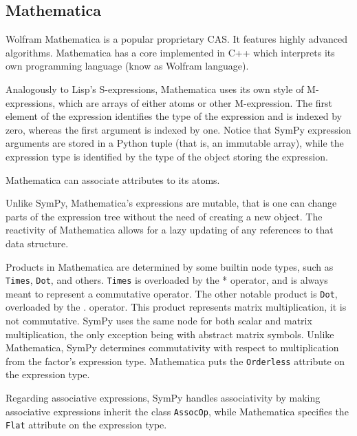 
\subsection{Mathematica}

Wolfram Mathematica is a popular proprietary CAS.
It features highly advanced algorithms.
Mathematica has a core implemented in C++
which interprets its own programming language (know as Wolfram language).


Analogously to Lisp's S-expressions,
Mathematica uses its own style of M-expressions,
which are arrays of either atoms or other M-expression.
The first element of the expression identifies the type of the expression
and is indexed by zero, whereas the first argument is indexed by one.
Notice that SymPy expression arguments are stored in a Python tuple
(that is, an immutable array),
while the expression type is identified by the type of the object storing the
expression.


Mathematica can associate attributes to its atoms.


Unlike SymPy, Mathematica's expressions are mutable,
that is one can change parts of the expression tree without the need of
creating a new object.
The reactivity of Mathematica allows for a lazy updating of any references
to that data structure.


Products in Mathematica are determined by some builtin node types,
such as \texttt{Times}, \texttt{Dot}, and others.
\texttt{Times} is overloaded by the * operator,
and is always meant to represent a commutative operator.
The other notable product is \texttt{Dot}, overloaded by the . operator.
This product represents matrix multiplication,
it is not commutative.
SymPy uses the same node for both scalar and matrix multiplication,
the only exception being with abstract matrix symbols.
Unlike Mathematica, SymPy determines commutativity with respect to
multiplication from the factor's expression type.
Mathematica puts the \texttt{Orderless} attribute on the expression
type.


Regarding associative expressions,
SymPy handles associativity by making associative expressions inherit the
class \texttt{AssocOp},
while Mathematica specifies the \texttt{Flat} attribute on the expression type.





